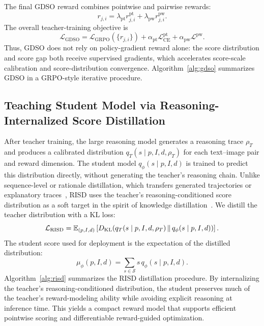 \documentclass{article}
\newcommand{\teaname}{GDSO\xspace}
\newcommand{\stuname}{RISD\xspace}
\begin{document}
The final GDSO reward combines pointwise and pairwise rewards:
\begin{equation}
r_{j,i}
=
\lambda_{\mathrm{pt}} r^{\mathrm{pt}}_{j,i}
+
\lambda_{\mathrm{pw}} r^{\mathrm{pw}}_{j,i}.
\label{eq:gdso-reward}
\end{equation}
The overall teacher-training objective is
\begin{equation}
\mathcal{L}_{\mathrm{GDSO}}
=
\mathcal{L}_{\mathrm{GRPO}}(\{r_{j,i}\})
+
\alpha_{\mathrm{pt}}\mathcal{L}^{\mathrm{pt}}_{\mathrm{CE}}
+
\alpha_{\mathrm{pw}}\mathcal{L}^{\mathrm{pw}}.
\label{eq:gdso-objective}
\end{equation}
Thus, \teaname does not rely on policy-gradient reward alone: the score distribution and score gap both receive supervised gradients, which accelerates score-scale calibration and score-distribution convergence. Algorithm~\ref{alg:gdso} summarizes \teaname in a GRPO-style iterative procedure.

\subsection{Teaching Student Model via Reasoning-Internalized Score Distillation}

After teacher training, the large reasoning model generates a reasoning trace $\rho_T$ and produces a calibrated distribution $q_T(s \mid p,I,d,\rho_T)$ for each text--image pair and reward dimension. The student model $q_\phi(s \mid p,I,d)$ is trained to predict this distribution directly, without generating the teacher's reasoning chain. Unlike sequence-level or rationale distillation, which transfers generated trajectories or explanatory traces~\cite{kim2016sequence,hsieh2023distilling}, \stuname uses the teacher's reasoning-conditioned score distribution as a soft target in the spirit of knowledge distillation~\cite{hinton2015distilling}. We distill the teacher distribution with a KL loss:
\begin{equation}
\mathcal{L}_{\mathrm{RISD}}
=
\mathbb{E}_{(p,I,d)}
\left[
D_{\mathrm{KL}}\!\left(
q_T(s \mid p,I,d,\rho_T)\,\|\,q_\phi(s \mid p,I,d)
\right)
\right].
\label{eq:risd-loss}
\end{equation}
The student score used for deployment is the expectation of the distilled distribution:
\begin{equation}
\mu_\phi(p,I,d)
=
\sum_{s \in \mathcal{S}} s \, q_\phi(s \mid p,I,d).
\label{eq:student-expected-score}
\end{equation}
Algorithm~\ref{alg:risd} summarizes the \stuname distillation procedure. By internalizing the teacher's reasoning-conditioned distribution, the student preserves much of the teacher's reward-modeling ability while avoiding explicit reasoning at inference time. This yields a compact reward model that supports efficient pointwise scoring and differentiable reward-guided optimization.
\end{document}
